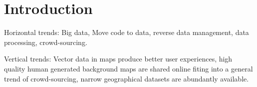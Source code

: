 \section{Introduction}
Horizontal trends: Big data, Move code to data, reverse data management, data processing, crowd-sourcing.

Vertical trends: Vector data in maps \cite{apple,googlemaps} produce better user experiences, high quality human generated background maps are shared online \cite{openstreetmap,googlemaps,tilemill}  fiting into a general trend of crowd-sourcing, narrow geographical datasets are abundantly available.
